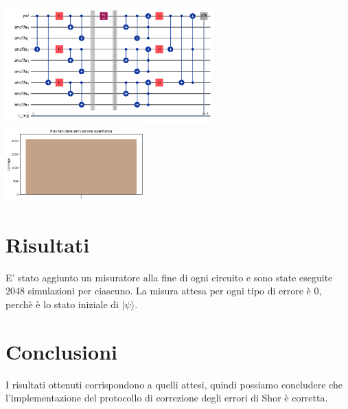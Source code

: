 \documentclass[12pt, a4paper]{article}
\newcommand{\ket}[1]{| #1 \rangle}
\begin{document}
\begin{center} 
        \includegraphics[width=0.6\textwidth]{img/circuitSmallError.png} 
        \includegraphics[width=0.4\textwidth]{img/resultsSuccessSmallError.png}
\end{center}

\section*{Risultati}
E' stato aggiunto un misuratore alla fine di ogni circuito e sono state eseguite 2048 simulazioni per ciascuno. La misura attesa per ogni tipo di errore è 0, perchè è lo stato iniziale di $\ket{\psi}$.

\section*{Conclusioni}
I risultati ottenuti corrispondono a quelli attesi, quindi possiamo concludere che l'implementazione del protocollo di correzione degli errori di Shor è corretta.
\end{document}
